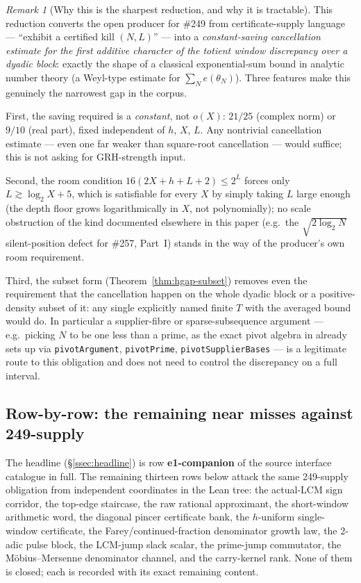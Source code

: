 \documentclass[11pt]{article}
\theoremstyle{plain}
\theoremstyle{definition}
\theoremstyle{remark}
\newtheorem{rem}[thm]{Remark}
\newcommand{\lean}[2]{\leanlink{#2}}
\begin{document}
\begin{rem}[Why this is the sharpest reduction, and why it is tractable]
This reduction converts the open producer for \#249 from certificate-supply language --- ``exhibit
a certified kill $(N,L)$'' --- into a \emph{constant-saving cancellation estimate for the first
additive character of the totient window discrepancy over a dyadic block}: exactly the shape of a
classical exponential-sum bound in analytic number theory (a Weyl-type estimate for
$\sum_N e(\theta_N)$). Three features make this genuinely the narrowest gap in the corpus.

First, the saving required is a \emph{constant}, not $o(X)$: $21/25$ (complex norm) or $9/10$
(real part), fixed independent of $h$, $X$, $L$. Any nontrivial cancellation estimate --- even one
far weaker than square-root cancellation --- would suffice; this is not asking for GRH-strength
input.

Second, the room condition $16(2X{+}h{+}L{+}2)\le 2^L$ forces only $L \gtrsim \log_2 X + 5$, which
is satisfiable for every $X$ by simply taking $L$ large enough (the depth floor grows logarithmically
in $X$, not polynomially); no scale obstruction of the kind documented elsewhere in this paper
(e.g.\ the $\sqrt{2\log_2 N}$ silent-position defect for \#257, Part~I) stands in the way of the
producer's own room requirement.

Third, the subset form (Theorem~\ref{thm:hgap-subset}) removes even the requirement that the
cancellation happen on the whole dyadic block or a positive-density subset of it: any single
explicitly named finite $T$ with the averaged bound would do. In particular a supplier-fibre or
sparse-subsequence argument --- e.g.\ picking $N$ to be one less than a prime, as the exact pivot
algebra in \lean{FirstHarmonicPivot.lean}{FirstHarmonicPivot.lean} already sets up via
\texttt{pivotArgument}, \texttt{pivotPrime}, \texttt{pivotSupplierBases} --- is a legitimate route
to this obligation and does not need to control the discrepancy on a full interval.
\end{rem}

\subsection{Row-by-row: the remaining near misses against 249-supply}

The headline (\S\ref{ssec:headline}) is row \textbf{e1-companion} of the source interface catalogue
in full. The remaining thirteen rows below attack the same 249-supply obligation from independent
coordinates in the Lean tree: the actual-LCM sign corridor, the top-edge staircase, the raw
rational approximant, the short-window arithmetic word, the diagonal pincer certificate bank, the
$h$-uniform single-window certificate, the Farey/continued-fraction denominator growth law, the
2-adic pulse block, the LCM-jump slack scalar, the prime-jump commutator, the M\"obius--Mersenne
denominator channel, and the carry-kernel rank. None of them is closed; each is recorded with its
exact remaining content.
\end{document}
